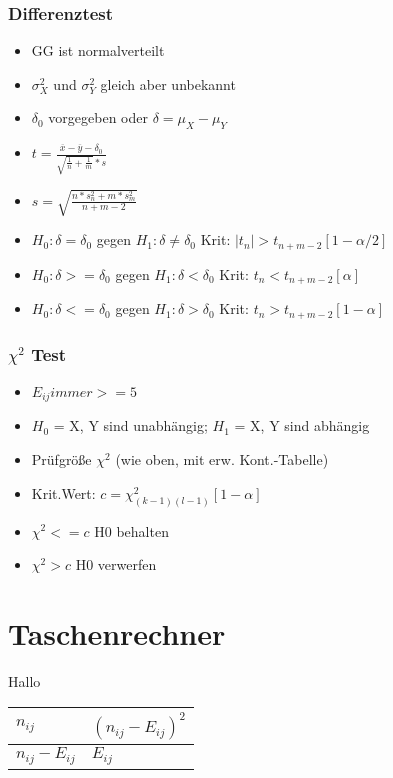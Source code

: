\documentclass[a4paper]{article}
\begin{document}
\begin{landscape}
\begin{multicols}{4}
        \subsubsection*{Differenztest}
        \begin{itemize}[noitemsep,nolistsep,leftmargin=*]
            \item GG ist normalverteilt
            \item $\sigma^2_X$ und $\sigma^2_Y$ gleich aber unbekannt
            \item $\delta_0$ vorgegeben oder $\delta = \mu_X - \mu_Y$
            \item $t = \frac{\overline{x}-\overline{y}-\delta_0}{\sqrt{\frac{1}{n}+\frac{1}{m}}* s}$
            \item $s = \sqrt{\frac{n*s^2_n + m*s^2_m}{n+m-2}}$
            \item $H_0: \delta=\delta_0$ gegen $H_1: \delta \neq \delta_0$ Krit: $|t_n| > t_{n+m-2}[1-\alpha/2]$
            \item  $H_0: \delta>=\delta_0$ gegen $H_1: \delta < \delta_0$ Krit: $t_n < t_{n+m-2}[\alpha]$
            \item $H_0: \delta<=\delta_0$ gegen $H_1: \delta > \delta_0$ Krit: $t_n > t_{n+m-2}[1-\alpha]$
        \end{itemize}
        
        \subsubsection*{$\chi^2$ Test}
        \begin{itemize}[noitemsep,nolistsep,leftmargin=*]
            \item $E_{ij} immer >= 5$
            \item $H_0$ = X, Y sind unabhängig; $H_1$ = X, Y sind abhängig 
            \item Prüfgröße $\chi^2$ (wie oben, mit erw. Kont.-Tabelle)
            \item Krit.Wert: $c = \chi^2_{(k-1)(l-1)}[1-\alpha]$
            \item $\chi^2 <= c$ H0 behalten
            \item $\chi^2 > c$ H0 verwerfen
        \end{itemize}
    \section*{Taschenrechner}
    Hallo
    
    \end{multicols}

    \begin{table}[]
        \begin{tabular}{l|l}
        $n_{ij}$ & $(n_{ij}-E_{ij})^2$           \\ \hline
        $n_{ij}-E_{ij}$           & $E_{ij}$
        \end{tabular}
        \end{table}
\end{landscape}
\end{document}
